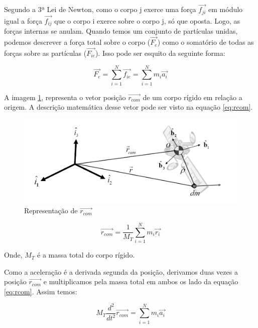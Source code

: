 Segundo a 3ª Lei de Newton, como o corpo j exerce uma força $\vec{f_{ji}}$ em módulo igual a força $\vec{f_{ij}}$ que o corpo i exerce sobre o corpo j, só que oposta. Logo, as forças internas se anulam. Quando temos um conjunto de partículas unidas, podemos descrever a força total sobre o corpo ($\vec{F_e}$) como o somatório de todas as forças sobre as partículas ($\vec{F_{ie}}$). Isso pode ser esquito da seguinte forma:

\begin{equation}\label{eq:fet}
  \vec{F_{e}}=\sum_{i=1}^{N}{\vec{f_{ie}}}=\sum_{i=1}^{N}{m_i\vec{a_i}} 
\end{equation}

A imagem \ref{fig:translacao_referencial_snider_p15}, representa o vetor posição $\vec{r_{com}}$ de um corpo rígido em relação a origem. A descrição matemática desse vetor pode ser visto na equação \ref{eq:rcom}.

\begin{figure}[!ht]
  \caption{Representação de $\vec{r_{com}}$}
  \begin{center}
      \includegraphics[scale=0.5]{img/translacao_referencial_snider_p15}
  \end{center}
  \label{fig:translacao_referencial_snider_p15}
\end{figure}

\begin{equation}\label{eq:rcom}
  \vec{r_{com}}=\frac{1}{M_T}\sum_{i=1}^{N}{m_i\vec{r_i}} 
\end{equation}

Onde, $M_T$ é a massa total do corpo rígido.

Como a aceleração é a derivada segunda da posição, derivamos duas vezes a posição $\vec{r_{com}}$ e multiplicamos pela massa total em ambos os lado da equação \ref{eq:rcom}. Assim temos:

\begin{equation}\label{eq:2deriv}
  M_T\frac{{d}^{2}}{{d}t^{2}}\vec{r_{com}}=\sum_{i=1}^{N}{m_i\vec{a_i}}
\end{equation}

